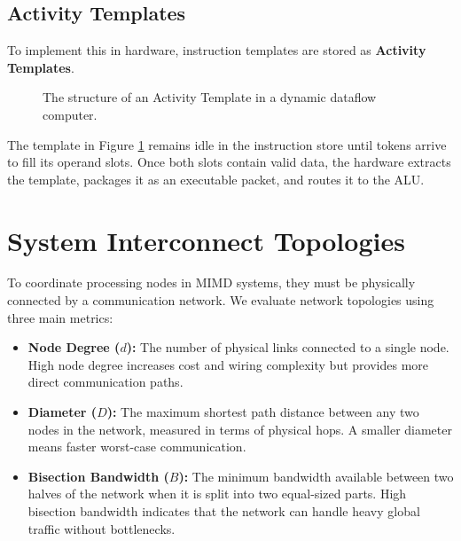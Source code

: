 \documentclass[12pt,a4paper,openany]{book}
\begin{document}
\subsection{Activity Templates}
To implement this in hardware, instruction templates are stored as \textbf{Activity Templates}.

\begin{figure}[htbp]
    \centering
    \caption{The structure of an Activity Template in a dynamic dataflow computer.}
    \label{fig:activity_template}
\end{figure}

The template in Figure \ref{fig:activity_template} remains idle in the instruction store until tokens arrive to fill its operand slots. Once both slots contain valid data, the hardware extracts the template, packages it as an executable packet, and routes it to the ALU.

\section{System Interconnect Topologies}
To coordinate processing nodes in MIMD systems, they must be physically connected by a communication network. We evaluate network topologies using three main metrics:
\begin{itemize}
    \item \textbf{Node Degree ($d$):} The number of physical links connected to a single node. High node degree increases cost and wiring complexity but provides more direct communication paths.
    \item \textbf{Diameter ($D$):} The maximum shortest path distance between any two nodes in the network, measured in terms of physical hops. A smaller diameter means faster worst-case communication.
    \item \textbf{Bisection Bandwidth ($B$):} The minimum bandwidth available between two halves of the network when it is split into two equal-sized parts. High bisection bandwidth indicates that the network can handle heavy global traffic without bottlenecks.
\end{itemize}
\end{document}
